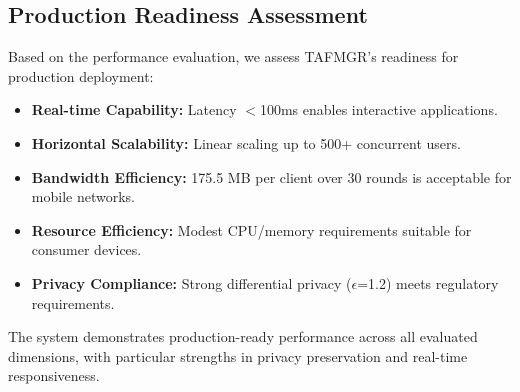 \subsection{Production Readiness Assessment}

Based on the performance evaluation, we assess TAFMGR's readiness for production deployment:

\begin{itemize}
    \item \textbf{Real-time Capability:} Latency $<$100ms enables interactive applications.
    \item \textbf{Horizontal Scalability:} Linear scaling up to 500+ concurrent users.
    \item \textbf{Bandwidth Efficiency:} 175.5 MB per client over 30 rounds is acceptable for mobile networks.
    \item \textbf{Resource Efficiency:} Modest CPU/memory requirements suitable for consumer devices.
    \item \textbf{Privacy Compliance:} Strong differential privacy ($\epsilon$=1.2) meets regulatory requirements.
\end{itemize}

The system demonstrates production-ready performance across all evaluated dimensions, with particular strengths in privacy preservation and real-time responsiveness.

